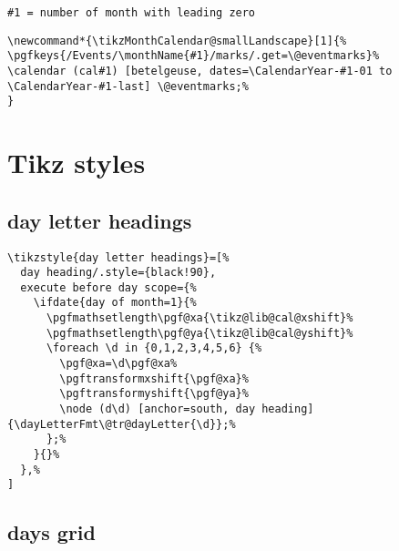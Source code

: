 \documentclass[11pt,oneside]{memoir-article}
\begin{document}
\begin{verbatim}
#1 = number of month with leading zero
\end{verbatim}

\begin{verbatim}
\newcommand*{\tikzMonthCalendar@smallLandscape}[1]{%
\pgfkeys{/Events/\monthName{#1}/marks/.get=\@eventmarks}%
\calendar (cal#1) [betelgeuse, dates=\CalendarYear-#1-01 to \CalendarYear-#1-last] \@eventmarks;%
}
\end{verbatim}

\section{Tikz styles}
\label{sec:orga66f8a7}
\subsection{day letter headings}
\label{sec:org8b1a47f}

\begin{verbatim}
\tikzstyle{day letter headings}=[%
  day heading/.style={black!90},
  execute before day scope={%
    \ifdate{day of month=1}{%
      \pgfmathsetlength\pgf@xa{\tikz@lib@cal@xshift}%
      \pgfmathsetlength\pgf@ya{\tikz@lib@cal@yshift}%
      \foreach \d in {0,1,2,3,4,5,6} {%
        \pgf@xa=\d\pgf@xa%
        \pgftransformxshift{\pgf@xa}%
        \pgftransformyshift{\pgf@ya}%
        \node (d\d) [anchor=south, day heading] {\dayLetterFmt\@tr@dayLetter{\d}};%
      };%
    }{}%
  },%
]
\end{verbatim}

\subsection{days grid}
\label{sec:orgfa12564}
\end{document}
